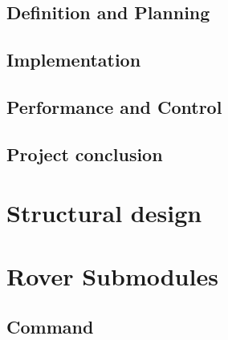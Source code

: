 \documentclass[11pt, a4paper]{article}
\begin{document}
\subsection{Definition and Planning}




\subsection{Implementation}




\subsection{Performance and Control}




\subsection{Project conclusion}



\vfill






\pagebreak

\section{Structural design}







\pagebreak



\pagebreak
\section{Rover Submodules}

\subsection{Command}
\end{document}
